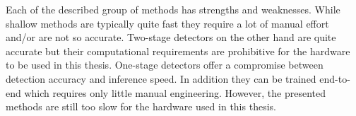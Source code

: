 	Each of the described group of methods has strengths and weaknesses. While shallow methods are typically quite fast they require a lot of manual effort and/or are not so accurate. Two-stage detectors on the other hand are quite accurate but their computational requirements are prohibitive for the hardware to be used in this thesis. One-stage detectors offer a compromise between detection accuracy and inference speed. In addition they can be trained end-to-end which requires only little manual engineering. However, the presented methods are still too slow for the hardware used in this thesis.


	

	



